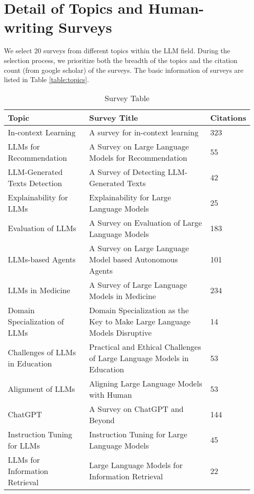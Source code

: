 

\appendix

\section{Detail of Topics and Human-writing Surveys}
We select 20 surveys from different topics within the LLM field. During the selection process, we prioritize both the breadth of the topics and the citation count (from google scholar) of the surveys. The basic information of surveys are listed in Table \ref{table:topics}.

\begin{table}[h!]
    \centering
    \tiny
    \caption{Survey Table}
    \begin{tabular}{lll} 
        \toprule
        \textbf{Topic} & \textbf{Survey Title} & \textbf{Citations} \\ 
        \midrule
         In-context Learning& A survey for in-context learning & 323 \\
         LLMs for Recommendation& A Survey on Large Language Models for Recommendation & 55 \\
         LLM-Generated Texts Detection& A Survey of Detecting LLM-Generated Texts & 42 \\
         Explainability for LLMs& Explainability for Large Language Models & 25 \\
         Evaluation of LLMs& A Survey on Evaluation of Large Language Models &  183\\
         LLMs-based Agents& A Survey on Large Language Model based Autonomous Agents & 101 \\
         LLMs in Medicine& A Survey of Large Language Models in Medicine & 234 \\
         Domain Specialization of LLMs& Domain Specialization as the Key to Make Large Language Models Disruptive & 14 \\
         Challenges of LLMs in Education& Practical and Ethical Challenges of Large Language Models in Education & 53\\
         Alignment of LLMs& Aligning Large Language Models with Human & 53 \\
         ChatGPT& A Survey on ChatGPT and Beyond & 144 \\
         Instruction Tuning for LLMs& Instruction Tuning for Large Language Models & 45 \\
         LLMs for Information Retrieval& Large Language Models for Information Retrieval & 22 \\

\end{tabular}
\end{table}
